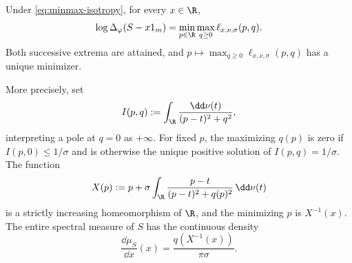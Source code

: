 \begin{proposition}\label{prop:minmax-isotropic}
Under \eqref{eq:minmax-isotropy}, for every $x\in\R$,
\begin{equation}\label{eq:minmax-isotropic}
 \log\Delta_\varphi(S-x1_m)
 =\min_{p\in\R}\max_{q\ge0}\ell_{x,\nu,\sigma}(p,q).
\end{equation}
Both successive extrema are attained, and $p\mapsto\max_{q\ge0}\ell_{x,\nu,\sigma}(p,q)$ has a unique minimizer.

More precisely, set
\[
 I(p,q):=\int_\R\frac{\dd\nu(t)}{(p-t)^2+q^2},
\]
interpreting a pole at $q=0$ as $+\infty$.
For fixed $p$, the maximizing $q(p)$ is zero if $I(p,0)\le1/\sigma$ and is otherwise the unique positive solution of $I(p,q)=1/\sigma$.
The function
\begin{equation}\label{eq:minmax-isotropic-coordinate}
 X(p):=p+\sigma\int_\R
          \frac{p-t}{(p-t)^2+q(p)^2}\,\dd\nu(t)
\end{equation}
is a strictly increasing homeomorphism of $\R$, and the minimizing $p$ is $X^{-1}(x)$.
The entire spectral measure of $S$ has the continuous density
\begin{equation}\label{eq:minmax-isotropic-density}
 \frac{\dd\mu_S}{\dd x}(x)
       =\frac{q(X^{-1}(x))}{\pi\sigma}.
\end{equation}
\end{proposition}

